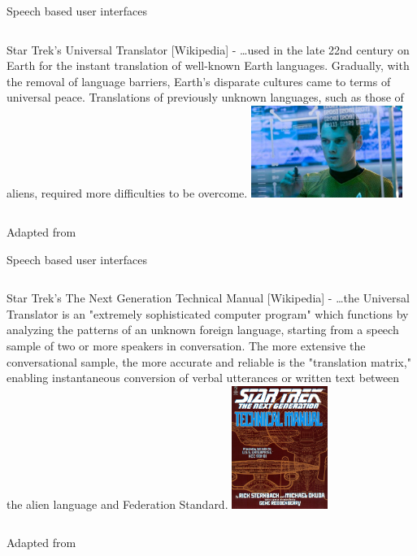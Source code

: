 \begin{frame}{Speech based user interfaces}{}
\begin{columns}[T]
    \column{2.5in}
     \alert{Star Trek's Universal Translator} [Wikipedia] -  \dots used in the late 22nd century on 
     Earth for the \alert{instant translation of well-known Earth languages}. Gradually, with 
     the removal of language barriers, Earth's disparate cultures came to terms of 
     universal peace. Translations of \alert{previously unknown languages}, such as those of 
     aliens, required more difficulties to be overcome. 
     \column{2in}
     \vspace{1cm}
     \includegraphics[height=30mm]{figures/startrek_comp}
  \end{columns}
\begin{center}
\tiny{Adapted from \cite{UNV}}
\end{center}
\end{frame}

\begin{frame}{Speech based user interfaces}{}
\begin{columns}[T]
    \column{3in}
     \alert{Star Trek's The Next Generation Technical Manual} [Wikipedia] -  \dots the Universal Translator 
     is an "extremely sophisticated computer program" which functions by \alert{analyzing the patterns} of an unknown 
     foreign language, starting from \alert{a speech sample of two or more speakers in conversation}. The more extensive 
     the conversational sample, the more accurate and reliable is the "translation matrix," enabling instantaneous 
     conversion of verbal utterances or written text between the alien language and Federation Standard.
     \column{1in}
     \vspace{1.2cm}
     \includegraphics[height=40mm]{figures/startrek_manual}
  \end{columns}
\begin{center}
\tiny{Adapted from \cite{STR}}
\end{center}
\end{frame}

